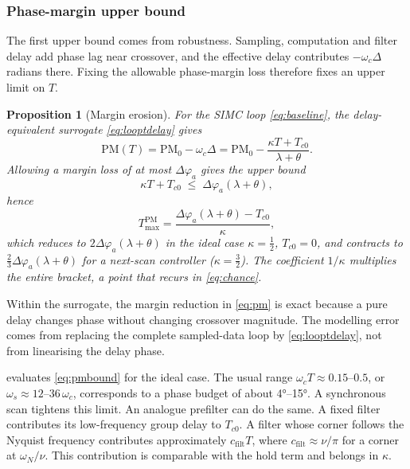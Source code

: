 \documentclass[a4paper,fleqn]{cas-sc}
\newtheorem{proposition}{Proposition}
\theoremstyle{remark}
\newcommand{\Tmax}{T_{\max}}
\newcommand{\wc}{\omega_c}
\begin{document}
\subsubsection{Phase-margin upper bound}
The first upper bound comes from robustness. Sampling, computation and filter delay add phase lag near crossover, and the effective delay contributes $-\wc\Delta$ radians there. Fixing the allowable phase-margin loss therefore fixes an upper limit on $T$.
\begin{proposition}[Margin erosion]
\label{prop:margin}
For the SIMC loop \cref{eq:baseline}, the delay-equivalent surrogate
\cref{eq:looptdelay} gives
\begin{equation}
\mathrm{PM}(T)=\mathrm{PM}_0-\wc\Delta
=\mathrm{PM}_0-\frac{\kappa T+T_{c0}}{\lambda+\theta}.
\label{eq:pm}
\end{equation}
Allowing a margin loss of at most $\Delta\varphi_a$ gives the upper bound
\begin{equation}
\kappa T+T_{c0}\;\le\;\Delta\varphi_a(\lambda+\theta),
\label{eq:pmbound}
\end{equation}
hence
\begin{equation}
\Tmax^{\mathrm{PM}}=\frac{\Delta\varphi_a(\lambda+\theta)-T_{c0}}{\kappa},
\label{eq:pmmax}
\end{equation}
which reduces to $2\Delta\varphi_a(\lambda+\theta)$ in the ideal case
$\kappa=\tfrac12$, $T_{c0}=0$, and contracts to
$\tfrac23\Delta\varphi_a(\lambda+\theta)$ for a next-scan controller
($\kappa=\tfrac32$). The coefficient $1/\kappa$ multiplies the entire
bracket, a point that recurs in \cref{eq:chance}.
\end{proposition}

Within the surrogate, the margin reduction in \cref{eq:pm} is exact because a
pure delay changes phase without changing crossover magnitude. The modelling
error comes from replacing the complete sampled-data loop by
\cref{eq:looptdelay}, not from linearising the delay phase.

 evaluates \cref{eq:pmbound} for the ideal case. The usual range $\wc T\approx0.15$--$0.5$, or $\omega_s\approx12$--$36\,\wc$, corresponds to a phase budget of about \ang{4}--\ang{15}. A synchronous scan tightens this limit. An analogue prefilter can do the same. A fixed filter contributes its low-frequency group delay to $T_{c0}$. A filter whose corner follows the Nyquist frequency contributes approximately $c_{\mathrm{filt}}T$, where $c_{\mathrm{filt}}\approx\nu/\pi$ for a corner at $\omega_N/\nu$. This contribution is comparable with the hold term and belongs in $\kappa$.
\end{document}
